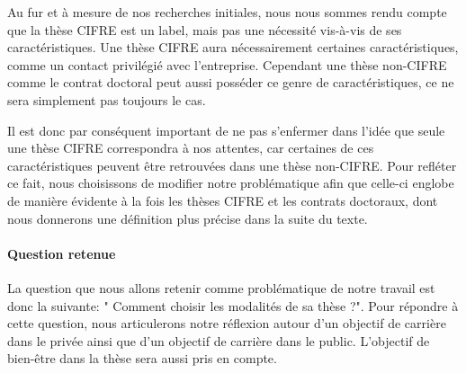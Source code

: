 \documentclass[12pt]{article}
\begin{document}
Au fur et à mesure de nos recherches initiales, nous nous sommes rendu compte que la thèse CIFRE est un label, mais pas une nécessité vis-à-vis de ses caractéristiques. Une thèse CIFRE aura nécessairement certaines caractéristiques, comme un contact privilégié avec l'entreprise. Cependant une thèse non-CIFRE comme le contrat doctoral peut aussi posséder ce genre de caractéristiques, ce ne sera simplement pas toujours le cas.

Il est donc par conséquent important de ne pas s'enfermer dans l'idée que seule une thèse CIFRE correspondra à nos attentes, car certaines de ces caractéristiques peuvent être retrouvées dans une thèse non-CIFRE. Pour refléter ce fait, nous choisissons de modifier notre problématique afin que celle-ci englobe de manière évidente à la fois les thèses CIFRE et les contrats doctoraux, dont nous donnerons une définition plus précise dans la suite du texte.

\paragraph{Question retenue} La question que nous allons retenir comme problématique de notre travail est donc la suivante: " Comment choisir les modalités de sa thèse ?". Pour répondre à cette question, nous articulerons notre réflexion autour d'un objectif de carrière dans le privée ainsi que d'un objectif de carrière dans le public. L'objectif de bien-être dans la thèse sera aussi pris en compte.

\end{document}
